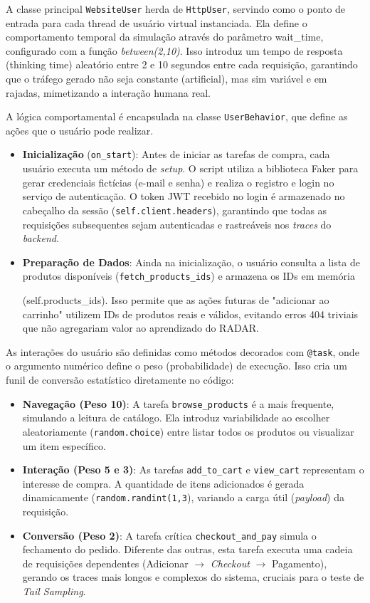 A classe principal \texttt{WebsiteUser} herda de \texttt{HttpUser}, servindo como o ponto de entrada para cada thread de usuário virtual instanciada. Ela define o comportamento temporal da simulação através do parâmetro wait\_time, configurado com a função \textit{between(2,10)}. Isso introduz um tempo de resposta (thinking time) aleatório entre 2 e 10 segundos entre cada requisição, garantindo que o tráfego gerado não seja constante (artificial), mas sim variável e em rajadas, mimetizando a interação humana real.

A lógica comportamental é encapsulada na classe \texttt{UserBehavior}, que define as ações que o usuário pode realizar.
\begin{itemize}
    \item \textbf{Inicialização} (\texttt{on\_start}): Antes de iniciar as tarefas de compra, cada usuário executa um método de \textit{setup}. O script utiliza a biblioteca Faker para gerar credenciais fictícias (e-mail e senha) e realiza o registro e login no serviço de autenticação. O token JWT recebido no login é armazenado no cabeçalho da sessão (\texttt{self.client.headers}), garantindo que todas as requisições subsequentes sejam autenticadas e rastreáveis nos \textit{traces} do \textit{backend}.
    \item \textbf{Preparação de Dados}: Ainda na inicialização, o usuário consulta a lista de produtos disponíveis (\texttt{fetch\_products\_ids}) e armazena os IDs em memória 
    
    (self.products\_ids). Isso permite que as ações futuras de "adicionar ao carrinho" utilizem IDs de produtos reais e válidos, evitando erros 404 triviais que não agregariam valor ao aprendizado do RADAR.
\end{itemize}

As interações do usuário são definidas como métodos decorados com \texttt{@task}, onde o argumento numérico define o peso (probabilidade) de execução. Isso cria um funil de conversão estatístico diretamente no código:
\begin{itemize}
    \item \textbf{Navegação (Peso 10)}: A tarefa \texttt{browse\_products} é a mais frequente, simulando a leitura de catálogo. Ela introduz variabilidade ao escolher aleatoriamente (\texttt{random.choice}) entre listar todos os produtos ou visualizar um item específico.
    \item \textbf{Interação (Peso 5 e 3)}: As tarefas \texttt{add\_to\_cart} e \texttt{view\_cart} representam o interesse de compra. A quantidade de itens adicionados é gerada dinamicamente (\texttt{random.randint(1,3}), variando a carga útil (\textit{payload}) da requisição.
    \item \textbf{Conversão (Peso 2)}: A tarefa crítica \texttt{checkout\_and\_pay} simula o fechamento do pedido. Diferente das outras, esta tarefa executa uma cadeia de requisições dependentes (Adicionar $\to$ \textit{Checkout} $\to$ Pagamento), gerando os traces mais longos e complexos do sistema, cruciais para o teste de \textit{Tail Sampling}.
\end{itemize}


